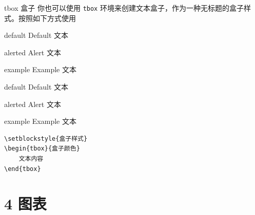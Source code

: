 \documentclass[10pt,aspectratio=169,fontset=none]{ctexbeamer}
\begin{document}
    \begin{frame}[fragile]{tbox 盒子}
        你也可以使用 \texttt{tbox} 环境来创建文本盒子，作为一种无标题的盒子样式。按照如下方式使用
        
        \begin{minipage}[b]{0.23\textwidth}
        \begin{tbox}{default}
            Default 文本
        \end{tbox}
        \begin{tbox}{alerted}
            Alert 文本
        \end{tbox}
        \begin{tbox}{example}
            Example 文本
        \end{tbox}      
        \end{minipage}
        \hspace{1cm}
        \begin{minipage}[b]{0.23\textwidth}
        \begin{tbox}{default}
            Default 文本
        \end{tbox}
        \begin{tbox}{alerted}
            Alert 文本
        \end{tbox}
        \begin{tbox}{example}
            Example 文本
        \end{tbox}      
        \end{minipage}
        \hspace{0.7cm}
        \begin{minipage}[b]{0.35\textwidth}
            \begin{verbatim}
\setblockstyle{盒子样式}
\begin{tbox}{盒子颜色}
    文本内容
\end{tbox}
            \end{verbatim}
        \end{minipage}
    \end{frame}

    \section{4 图表}
\end{document}
